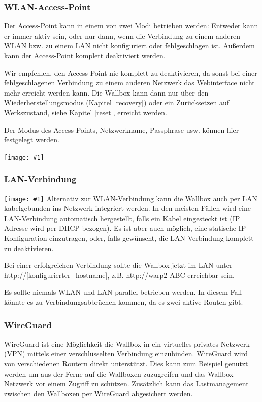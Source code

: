 \documentclass[a4paper,10pt]{article}
\newcommand{\hint}[1]{\begin{tcolorbox}[colback=boxgray,colframe=black,coltext=
white,title=Hinweis,left*=2mm,right*=2mm,boxsep=1mm,bottom=1mm,top=1mm]#1\end{tcolorbox}}
\newcommand{\gfx}[1]{\texttt{[image: \#1]}}
\begin{document}
\begin{multicols*}{2}
	\vspace{-0.4cm}
	\subsubsection{WLAN-Access-Point}
	\vspace{-0.1cm}
	Der Access-Point kann in einem von zwei Modi betrieben werden: Entweder kann er immer aktiv sein,
	oder nur dann, wenn die Verbindung zu einem anderen WLAN bzw. zu einem LAN nicht konfiguriert oder fehlgeschlagen ist.
	Außerdem kann der Access-Point komplett deaktiviert werden.
	\hint{Wir empfehlen, den Access-Point nie komplett zu deaktivieren, da sonst bei einer
		fehlgeschlagenen Verbindung zu einem anderen Netzwerk das Webinterface nicht mehr erreicht
		werden kann. Die Wallbox kann dann nur über den Wiederherstellungsmodus
		(Kapitel \ref{recovery}) oder ein Zurücksetzen auf Werkszustand, siehe Kapitel \ref{reset}, erreicht werden.}

	Der Modus des Access-Points, Netzwerkname, Passphrase usw. können hier festgelegt werden.

	\gfx{./img_warp2/resized/web_wifi_ap}

	\subsubsection{LAN-Verbindung}
	\gfx{./img_warp2/resized/web_ethernet}
	Alternativ zur WLAN-Verbindung kann die Wallbox auch per LAN kabelgebunden
	ins Netzwerk integriert werden. In den meisten Fällen wird eine
	LAN-Verbindung automatisch hergestellt, falls ein Kabel eingesteckt ist
	(IP Adresse wird per DHCP bezogen). Es ist aber auch möglich,
	eine statische IP-Konfiguration	einzutragen, oder, falls gewünscht, die LAN-Verbindung
	komplett zu deaktivieren.

	Bei einer erfolgreichen Verbindung sollte die Wallbox jetzt im LAN unter
	\url{http://[konfigurierter_hostname]}, z.B. \url{http://warp2-ABC} erreichbar sein.

	\hint{Es sollte niemals WLAN und LAN parallel betrieben werden. In diesem
	Fall könnte es zu Verbindungsabbrüchen kommen, da es zwei aktive Routen
	gibt.}

	\subsubsection{WireGuard}

	WireGuard ist eine Möglichkeit die Wallbox in ein virtuelles privates Netzwerk (VPN)
	mittels einer verschlüsselten Verbindung einzubinden. WireGuard wird von
	verschiedenen Routern direkt unterstützt. Dies kann zum Beispiel genutzt
	werden um aus der Ferne auf die Wallboxen zuzugreifen und das
	Wallbox-Netzwerk vor einem Zugriff zu schützen. Zusätzlich kann das
	Lastmanagement zwischen den Wallboxen per WireGuard abgesichert werden.


\end{multicols*}
\end{document}
